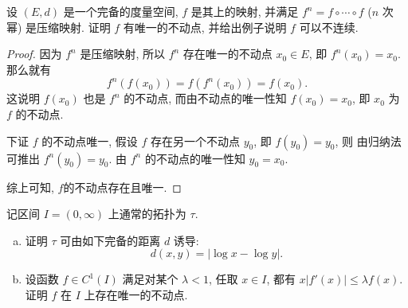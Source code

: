 \begin{exercise}
    设 $(E,d)$ 是一个完备的度量空间, $f$ 是其上的映射, 并满足 $f^n=f\circ\cdots\circ f$
    ($n$ 次幂) 是压缩映射. 证明 $f$ 有唯一的不动点, 并给出例子说明 $f$ 可以不连续.
\end{exercise}

\begin{proof}
    因为 $f^n$ 是压缩映射, 所以 $f^n$ 存在唯一的不动点 $x_0\in E$, 即
    $f^n(x_0)=x_0$. 那么就有
    \[f^n(f(x_0))=f(f^n(x_0))=f(x_0).\]
    这说明 $f(x_0)$ 也是 $f^n$ 的不动点, 而由不动点的唯一性知 $f(x_0)=x_0$, 即 $x_0$ 为 $f$ 的不动点.

    下证 $f$ 的不动点唯一, 假设 $f$ 存在另一个不动点 $y_0$, 即 $f(y_0)=y_0$, 则
    由归纳法可推出 $f^n(y_0)=y_0$. 由 $f^n$ 的不动点的唯一性知 $y_0=x_0$.
    
    综上可知, $f$的不动点存在且唯一.
\end{proof}

\begin{exercise}
  记区间 $I=(0,\infty)$ 上通常的拓扑为 $\tau$.
  \begin{enumerate}[(a)]
    \item 证明 $\tau$ 可由如下完备的距离 $d$ 诱导:
      \[d(x,y)=|\log x-\log y|.\]
    \item 设函数 $f\in C^1(I)$ 满足对某个 $\lambda<1$, 任取 $x\in I$, 都有
      $x|f'(x)|\leq\lambda f(x)$. 证明 $f$ 在 $I$ 上存在唯一的不动点.
  \end{enumerate}
\end{exercise}

